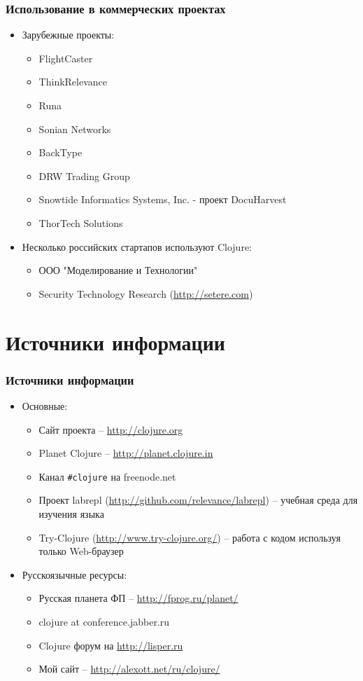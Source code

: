\documentclass[ignorenonframetext]{beamer}
\begin{document}
\begin{frame}[t]
  \frametitle{Использование в коммерческих проектах}
  \begin{itemize}
  \item Зарубежные проекты:
    \begin{itemize}
    \item FlightCaster
    \item ThinkRelevance
    \item Runa
    \item Sonian Networks
    \item BackType
    \item DRW Trading Group
    \item Snowtide Informatics Systems, Inc. - проект DocuHarvest
    \item ThorTech Solutions
    \end{itemize}
  \item Несколько российских стартапов используют Clojure:
    \begin{itemize}
    \item ООО "Моделирование и Технологии"
    \item Security Technology Research (\url{http://setere.com})
    \end{itemize}
  \end{itemize}
\end{frame}

\section{Источники информации}

\begin{frame}[t,fragile]
  \frametitle{Источники информации}
  \begin{itemize}
  \item Основные:
    \begin{itemize}
    \item Сайт проекта -- \url{http://clojure.org}
    \item Planet Clojure -- \url{http://planet.clojure.in}
    \item Канал \lstinline|#clojure| на freenode.net
    \item Проект labrepl (\url{http://github.com/relevance/labrepl}) -- учебная среда для
      изучения языка
    \item Try-Clojure (\url{http://www.try-clojure.org/}) -- работа с кодом используя
      только Web-браузер
    \end{itemize}
  \item Русскоязычные ресурсы:
    \begin{itemize}
    \item Русская планета ФП -- \url{http://fprog.ru/planet/}
    \item clojure at conference.jabber.ru
    \item Clojure форум на \url{http://lisper.ru}
    \item Мой сайт -- \url{http://alexott.net/ru/clojure/}
    \end{itemize}
  \end{itemize}
\end{frame}
\end{document}
